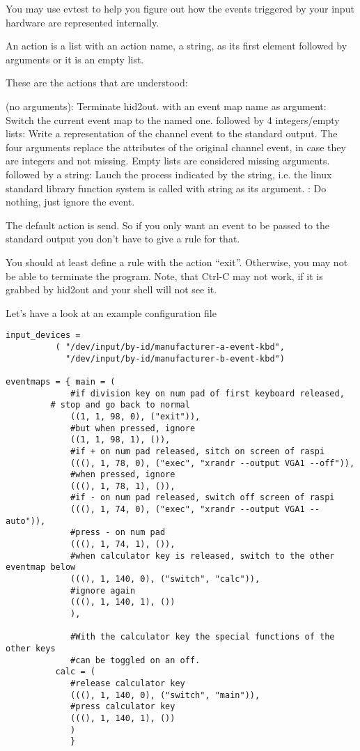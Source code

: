 \begin{pdescription}
  You may use evtest to help you figure out how the events 
  triggered by your input hardware 
  are represented internally.

  An action is a list with an action name, a string, 
  as its first element followed by arguments or
  it is an empty list.
 
  These are the actions that are understood:

  \begin{pdescription}
   (no arguments):
    Terminate hid2out.
   with an event map name as argument:
    Switch the current event map to the named one.
   followed by 4 integers/empty lists:
    Write a representation of the channel event to the 
    standard output. The four arguments replace the
    attributes of the original channel event,
    in case they are integers and not missing.
    Empty lists are considered missing arguments.
   followed by a string:
    Lauch the process indicated by the string, i.e. the linux standard library function system is 
    called with string as its argument.
  :
    Do nothing, just ignore the event.
  \end{pdescription}
  
  The default action is send. So if you only want an event
  to be passed to the standard output you don't have to
  give a rule for that.

  You should at least define a rule with the action ``exit''.
  Otherwise, you may not be able to terminate the program.
  Note, that Ctrl-C may not work, if it is grabbed by 
  hid2out and your shell will not see it.
\end{pdescription}

Let's have a look at an example configuration file

\begin{verbatim}
input_devices =
	      (	"/dev/input/by-id/manufacturer-a-event-kbd",
	        "/dev/input/by-id/manufacturer-b-event-kbd")

eventmaps = { main = (
	      	 #if division key on num pad of first keyboard released,
		 # stop and go back to normal
	      	 ((1, 1, 98, 0), ("exit")),
	      	 #but when pressed, ignore
	      	 ((1, 1, 98, 1), ()),
 	      	 #if + on num pad released, sitch on screen of raspi
	      	 (((), 1, 78, 0), ("exec", "xrandr --output VGA1 --off")),
	      	 #when pressed, ignore
	      	 (((), 1, 78, 1), ()),
 	      	 #if - on num pad released, switch off screen of raspi
	      	 (((), 1, 74, 0), ("exec", "xrandr --output VGA1 --auto")),
	      	 #press - on num pad 
	      	 (((), 1, 74, 1), ()),
	      	 #when calculator key is released, switch to the other eventmap below
	      	 (((), 1, 140, 0), ("switch", "calc")),
	      	 #ignore again
	      	 (((), 1, 140, 1), ())
	      	 ),

	      	 #With the calculator key the special functions of the other keys
	      	 #can be toggled on an off.
	      calc = (
	      	 #release calculator key
	      	 (((), 1, 140, 0), ("switch", "main")),
	      	 #press calculator key
	      	 (((), 1, 140, 1), ())
	      	 )   
	      	 }  
\end{verbatim}

